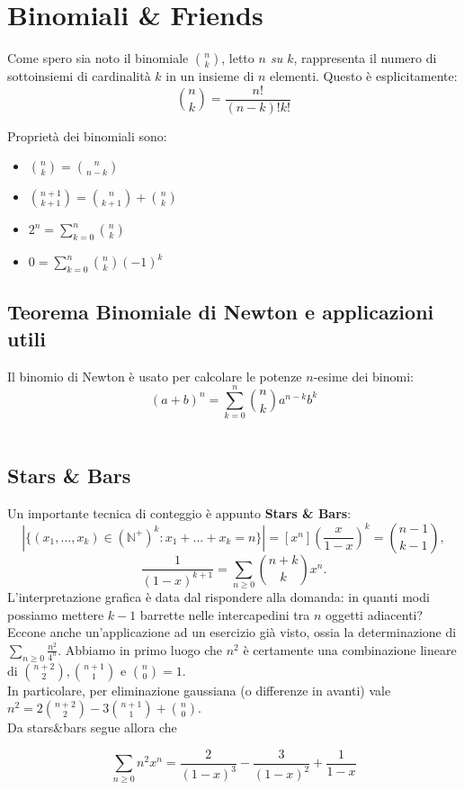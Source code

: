 \documentclass[a4paper,twoside]{article}
\newcommand{\N}{\mathbb{N}}
\theoremstyle{definition}
\numberwithin{theorem}{section}
\begin{document}
\section{Binomiali \& Friends}
Come spero sia noto il binomiale $\binom{n}{k}$, letto \emph{$n$ su $k$}, rappresenta il numero di sottoinsiemi di cardinalità $k$ in un insieme di $n$ elementi.
Questo è esplicitamente:\\
$$\binom{n}{k} = \frac{n!}{(n-k)!k!}$$    

Proprietà dei binomiali sono: \\
\begin{itemize}
    \item $\binom{n}{k}=\binom{n}{n-k}$
    \item $\binom{n+1}{k+1}=\binom{n}{k+1} + \binom{n}{k}$
    \item $2^n= \sum_{k=0}^{n}\binom{n}{k}$
    \item $0 = \sum_{k=0}^{n}\binom{n}{k}(-1)^k$
\end{itemize}

\subsection{Teorema Binomiale di Newton e applicazioni utili}
Il binomio di Newton è usato per calcolare le potenze $n$-esime dei binomi:
$$(a+b)^n=\sum_{k=0}^{n}\binom{n}{k}a^{n-k}b^k$$
\\
\subsection{Stars \& Bars}
Un importante tecnica di conteggio è appunto \textbf{Stars \& Bars}:
$$\left|\{(x_1,\ldots,x_k)\in(\N^+)^k: x_1+\ldots+x_k = n\}\right|=[x^n]\left(\frac{x}{1-x}\right)^k = \binom{n-1}{k-1},$$
$$ \frac{1}{(1-x)^{k+1}}=\sum_{n\geq 0}\binom{n+k}{k}x^n. $$
L'interpretazione grafica è data dal rispondere alla domanda: in quanti modi possiamo mettere $k-1$ barrette nelle intercapedini tra $n$ oggetti adiacenti? Eccone anche un'applicazione ad un esercizio già visto, ossia la determinazione di $\sum_{n\geq 0}\frac{n^2}{4^n}$. Abbiamo in primo luogo che $n^2$ è certamente una combinazione lineare di $\binom{n+2}{2},\binom{n+1}{1}$ e $\binom{n}{0}=1$.\\ In particolare, per eliminazione gaussiana (o differenze in avanti) vale $n^2=2\binom{n+2}{2}-3\binom{n+1}{1}+\binom{n}{0}$.\\ Da stars\&bars segue allora che 

$$ \sum_{n\geq 0} n^2 x^n = \frac{2}{(1-x)^3}-\frac{3}{(1-x)^2}+\frac{1}{1-x} $$
\end{document}
